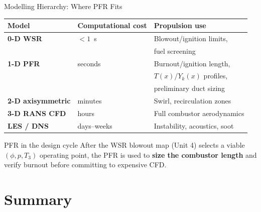 \documentclass[12pt,aspectratio=169]{beamer}
\begin{document}
\begin{frame}{Modelling Hierarchy: Where PFR Fits}

  \renewcommand{\arraystretch}{1.35}
  \begin{tabular}{>{\bfseries}p{3.4cm} p{4.0cm} p{4.2cm}}
    \toprule
    Model & Computational cost & Propulsion use \\
    \midrule
    0-D WSR & $< 1$~s & Blowout/ignition limits,\\
             &          & fuel screening \\
    \alert{1-D PFR} & \alert{seconds} &
      \alert{Burnout/ignition length,}\\
      & & \alert{$T(x)$/$Y_k(x)$ profiles,}\\
      & & \alert{preliminary duct sizing} \\
    2-D axisymmetric & minutes & Swirl, recirculation zones \\
    3-D RANS CFD & hours & Full combustor aerodynamics \\
    LES / DNS & days--weeks & Instability, acoustics, soot \\
    \bottomrule
  \end{tabular}

  \medskip
  \begin{block}{PFR in the design cycle}
    After the WSR blowout map (Unit 4) selects a viable $(\phi, p, T_3)$
    operating point, the PFR is used to \textbf{size the combustor length}
    and verify burnout before committing to expensive CFD.
  \end{block}
\end{frame}

\section{Summary}
\end{document}
